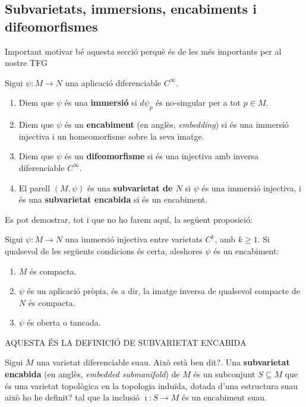 \subsection{Subvarietats, immersions, encabiments i difeomorfismes}
{\color{blue} Important motivar bé aquesta secció perquè és de les més importants per al nostre TFG}
\begin{defi}
    Sigui $\psi:M\to N$ una aplicació diferenciable {\color{blue} $C^\infty$}.
    \begin{enumerate}
        \item Diem que $\psi$ és una \textbf{immersió} si $d\psi_p$ és no-singular per a tot $p\in M$.
        \item Diem que $\psi$ és un \textbf{encabiment} (en anglès, \textit{embedding}) si és una immersió injectiva i un homeomorfisme sobre la seva imatge.
        \item Diem que $\psi$ és un \textbf{difeomorfisme} si és una injectiva amb inversa diferenciable {\color{blue} $C^\infty$}.
        \item El parell $(M, \psi)$ és una \textbf{subvarietat de $N$} si $\psi$ és una immersió injectiva, i és una \textbf{subvarietat encabida} si és un encabiment.
    \end{enumerate}
\end{defi}

Es pot demostrar, {\color{blue} tot i que no ho farem aquí,} la següent proposició:
\begin{prop}\label{prop:encabiment_immersio}
    Sigui $\psi:M\to N$ una immersió injectiva entre varietats $C^k$, amb $k\ge 1$. Si qualsevol de les següents condicions és certa, aleshores $\psi$ és un encabiment:
    \begin{enumerate}
        \item $M$ és compacta.
        \item $\psi$ és un aplicació pròpia, és a dir, la imatge inversa de qualsevol compacte de $N$ és compacta.
        \item $\psi$ és oberta o tancada.
    \end{enumerate}
\end{prop}

{\color{blue}AQUESTA ÉS LA DEFINICIÓ DE SUBVARIETAT ENCABIDA

\begin{defi}
    Sigui $M$ una varietat diferenciable suau. {\color{blue} Això està ben dit?}. Una \textbf{subvarietat encabida} (en anglès, \textit{embedded submanifold}) de $M$ és un subconjunt $S\subseteq M$ que és una varietat topològica en la topologia induïda, dotada d'una estructura suau{\color{blue} això ho he definit?} tal que la inclusió $\imath:S\to M$ és un encabiment suau. 
\end{defi}
}

